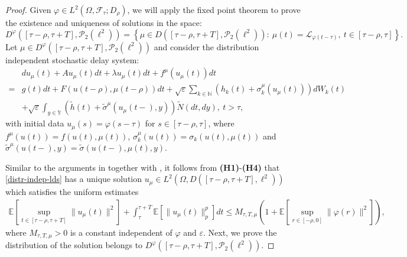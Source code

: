 \documentclass[11pt]{article}
\numberwithin{equation}{section}
\theoremstyle{plain}
\begin{document}
\begin{proof}
Given  $ \varphi \in L^2(\Omega, \mathcal{F}_{\tau}; D_\rho)$,
we will apply the fixed point 
theorem 
 to prove the existence 
and uniqueness of solutions
in the space:
$$
D^\varphi([\tau-\rho, \tau+T], \mathcal{P}_2(\ell^2))
=
\left \{
\mu \in D([\tau-\rho, \tau+T], \mathcal{P}_2(\ell^2)):
\   {\mu}(t) = \mathcal{L}_{\varphi(t-\tau)},
\   t \in [\tau-\rho, \tau]  
\right \}.
$$
 Let  $\mu \in 
 D^\varphi([\tau-\rho, \tau+T], \mathcal{P}_2(\ell^2))$ 
 and  consider the distribution independent stochastic delay system:
 \begin{align}\label{distr-indep-lds}
      & d u_{\mu}(t)
        + Au_{\mu}(t) dt
        + \lambda u_{\mu}(t) dt
        + f^{\mu}(u_{\mu}(t)) dt \nonumber \nonumber \\
    = & g(t) dt
        + F( u(t-\rho), {\mu}(t-\rho) ) dt
        + \sqrt{\varepsilon}\sum_{k \in \mathbb{N} }
                \left( h_k(t) + \sigma_k^{\mu}( u_{\mu}(t))
                \right) dW_k(t) \nonumber \\
       & + \sqrt{\varepsilon}  
                   \int_{y \in \mathbb{Y} }
                        \left( \widetilde{h}(t) 
                                  + \widetilde{\sigma}^{\mu}(u_{\mu}(t-), y)
                        \right)
                   \widetilde{N}(dt,dy), \  t > \tau,
 \end{align}
 with initial data
 $u_{\mu}(s) = \varphi(s-\tau)$ for $s \in [\tau-\rho, \tau]$,
 where
  $f^{\mu}(u(t)) = f(u(t),\mu (t) )$,
  $\sigma_k^{\mu}( u(t)) = \sigma_k( u(t), \mu
  (t))$ and 
  $\widetilde{\sigma}^{\mu}(u(t-), y) = \widetilde{\sigma}(u(t-), \mu (t), y)$.

 Similar to the arguments in \cite[Theorem 3.1]{CYZ2023SAA}
 together with \cite{WW2020SPA},
 it follows from {\bf(H1)}-{\bf(H4)} that \eqref{distr-indep-lds} has a unique solution $ u_{\mu} \in L^2(\Omega, D([\tau-\rho,\tau + T],\ell^2))$
 which satisfies  the uniform estimates
 \begin{align*}
    \mathbb{E}
              \left[ \sup_{t \in [\tau-\rho,\tau + T]} \|u_{\mu}(t)\|^2
              \right]
    + \int_{\tau}^{\tau+T} \mathbb{E} \left[ \|u_\mu(t)\|^p_p \right] dt
   \le  M_{\tau, T,\mu} \left( 1 + \mathbb{E} \left[ \sup_{r \in [-\rho,0]} \|\varphi(r)\|^2 \right]  \right),
 \end{align*}
 where $ M_{\tau, T, \mu}>0$
 is a constant
   independent of $\varphi$
   and $\varepsilon$.
   Next, we prove the distribution
   of the solution
   belongs
   to 
   $ D^\varphi([\tau-\rho, \tau + T], \mathcal{P}_2(\ell^2))$.


\end{proof}
\end{document}
